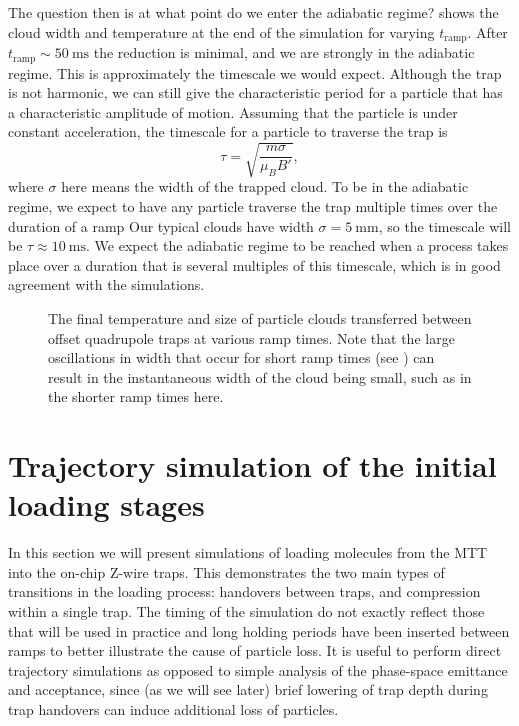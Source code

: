 The question then is at what point do we enter the adiabatic regime?
 shows the cloud width and temperature at the end
of the simulation for varying $t_\text{ramp}$. After
$t_\text{ramp}\sim\SI{50}{\milli\second}$ the reduction is minimal, and we are
strongly in the adiabatic regime. This is approximately the timescale we
would expect. Although the trap is not harmonic, we can still give the
characteristic period for a particle that has a characteristic amplitude of
motion. Assuming that the particle is under constant acceleration, the
timescale for a particle to traverse the trap is
%
\begin{equation}
  \tau = \sqrt{\frac{m \sigma}{\mu_B B'}},
\end{equation}
%
where $\sigma$ here means the width of the trapped cloud. To be in the
adiabatic regime, we expect to have any particle traverse the trap multiple
times over the duration of a ramp Our typical \CaF{}
clouds
have width $\sigma = \SI{5}{\milli\meter}$, so the timescale will be $\tau
\approx \SI{10}{\milli\second}$. We expect the adiabatic regime to
be reached when a process takes place over a duration that is several multiples
of this timescale, which is in good agreement with the simulations.

\begin{figure}[t!]
\centering
  \caption[Effect of ramp duration on phase-space distribution]{
    The final temperature and size of particle clouds transferred between
    offset quadrupole traps at various ramp times. Note that the large
    oscillations in width that occur for short ramp times (see
    ) can result in the instantaneous width of
    the cloud being small, such as in the shorter ramp times here.
  }
  \label{sim:fig:adiavary}
\end{figure}

\section{Trajectory simulation of the initial loading stages}

In this section we will present simulations of loading molecules from the MTT
into the on-chip Z-wire traps. 
This demonstrates
the two main types of transitions in the loading process: handovers between
traps, and compression within a single trap. The timing of the simulation do
not exactly reflect those that will be used in practice and long holding periods
have been inserted between ramps to better illustrate the cause of particle
loss. It is useful to perform direct trajectory simulations as opposed to
simple analysis of the phase-space emittance and acceptance, since (as we will
see later) brief lowering of trap depth during trap handovers can induce
additional loss of particles.

